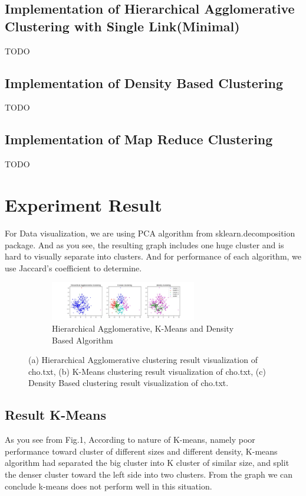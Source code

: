 \documentclass[fleqn]{llncs}
\begin{document}
\subsection{Implementation of Hierarchical Agglomerative Clustering with Single Link(Minimal)}
TODO

\subsection{Implementation of Density Based Clustering}
TODO

\subsection{Implementation of Map Reduce Clustering}
TODO
\section{Experiment Result}
For Data visualization, we are using PCA algorithm from sklearn.decomposition package. And as you see, the resulting graph includes one huge cluster and is hard to visually separate into clusters. And for performance of each algorithm, we use Jaccard's coefficient to determine.
\begin{figure}
	\centering
	\begin{subfigure}{1.0\textwidth}
		\centering\includegraphics[width=0.7\textwidth]{hier.jpg}
		\caption{Hierarchical Agglomerative, K-Means and Density Based Algorithm}
	\end{subfigure}
	\caption{(a) Hierarchical Agglomerative clustering result visualization of cho.txt, (b) K-Means clustering result visualization of cho.txt, (c) Density Based clustering result visualization of cho.txt.}
	\label{fig2}
\end{figure}
\subsection{Result K-Means}
As you see from Fig.1, According to nature of K-means, namely poor performance toward cluster of different sizes and different density, K-means algorithm had separated the big cluster into K cluster of similar size, and split the denser cluster toward the left side into two clusters. From the graph we can conclude k-means does not perform well in this situation.
\end{document}
